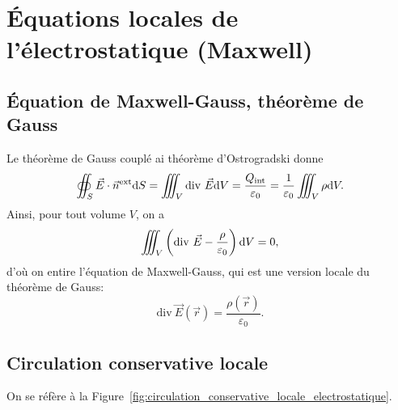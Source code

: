\section{Équations locales de l'électrostatique (Maxwell)}

    \subsection{Équation de Maxwell-Gauss, théorème de Gauss}

        Le théorème de Gauss couplé ai théorème d'Ostrogradski donne
        \begin{equation}
            \oiint_{S}\vec{E}\cdot\vec{n}^{\text{ext}}\mathrm{d} S=\iiint_{V}\mathrm{div}~\vec{E}\mathrm{d} V=\frac{Q_{\text{int}}}{\varepsilon_0}=\frac{1}{\varepsilon_0}\iiint_{V}\rho\mathrm{d} V.
        \end{equation}
        Ainsi, pour tout volume $V$, on a 
        \begin{equation}
            \iiint_{V}\left(
                \mathrm{div}~\vec{E}-\frac{\rho}{\varepsilon_0}
            \right)\mathrm{d} V=0,
        \end{equation}
        d'où on entire l'équation de Maxwell-Gauss, qui est une version locale du théorème de Gauss:
        \begin{equation}
            \boxed{
                \mathrm{div}~\vec{E}(\vec{r})=\frac{\rho(\vec{r})}{\varepsilon_0}.
            }
        \end{equation}

    \subsection{Circulation conservative locale}

        On se réfère à la Figure~\ref{fig:circulation_conservative_locale_electrostatique}.

